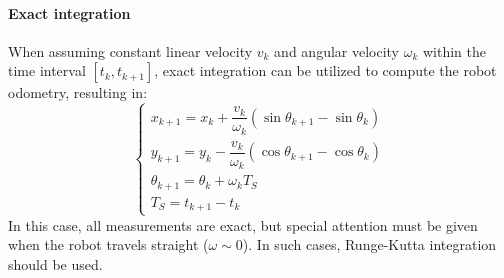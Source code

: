 \paragraph*{Exact integration}
When assuming constant linear velocity $v_k$ and angular velocity $\omega_k$ within the time interval $\left[ t_k,t_{k+1} \right]$, exact integration can be utilized to compute the robot odometry, resulting in:
\[\begin{cases}
    x_{k+1} = x_k + \dfrac{v_k}{\omega_k}\left( \sin\theta_{k+1} - \sin\theta_k \right) \\
    y_{k+1} = y_k - \dfrac{v_k}{\omega_k}\left( \cos\theta_{k+1} - \cos\theta_k \right) \\
    \theta_{k+1} = \theta_k + \omega_kT_S \\
    T_S=t_{k+1}-t_k
\end{cases}\]
In this case, all measurements are exact, but special attention must be given when the robot travels straight ($\omega \sim 0$). 
In such cases, Runge-Kutta integration should be used.
